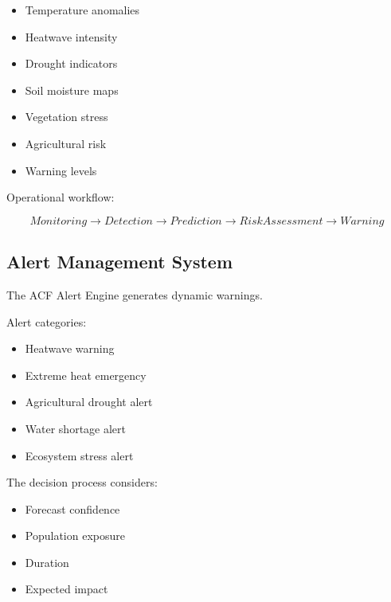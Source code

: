\begin{itemize}

\item Temperature anomalies

\item Heatwave intensity

\item Drought indicators

\item Soil moisture maps

\item Vegetation stress

\item Agricultural risk

\item Warning levels

\end{itemize}


Operational workflow:

\[
Monitoring
\rightarrow
Detection
\rightarrow
Prediction
\rightarrow
RiskAssessment
\rightarrow
Warning
\]



\subsection{Alert Management System}

The ACF Alert Engine generates dynamic warnings.

Alert categories:

\begin{itemize}

\item Heatwave warning

\item Extreme heat emergency

\item Agricultural drought alert

\item Water shortage alert

\item Ecosystem stress alert

\end{itemize}


The decision process considers:

\begin{itemize}

\item Forecast confidence

\item Population exposure

\item Duration

\item Expected impact

\end{itemize}


